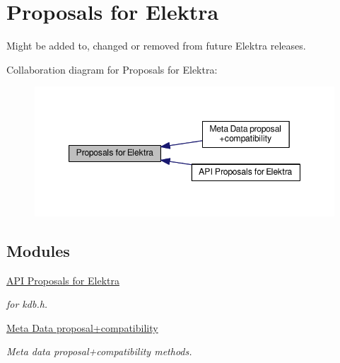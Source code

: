 \hypertarget{group__proposal}{\section{Proposals for Elektra}
\label{group__proposal}
}


Might be added to, changed or removed from future Elektra releases.  


Collaboration diagram for Proposals for Elektra\+:
\nopagebreak
\begin{figure}[H]
\begin{center}
\leavevmode
\includegraphics[width=347pt]{group__proposal}
\end{center}
\end{figure}
\subsection*{Modules}
\begin{DoxyCompactItemize}
\item 
\hyperlink{group__api}{A\+P\+I Proposals for Elektra}
\begin{DoxyCompactList}\small\item\em for kdb.\+h. \end{DoxyCompactList}\item 
\hyperlink{group__meta}{Meta Data proposal+compatibility}
\begin{DoxyCompactList}\small\item\em Meta data proposal+compatibility methods. \end{DoxyCompactList}\end{DoxyCompactItemize}
